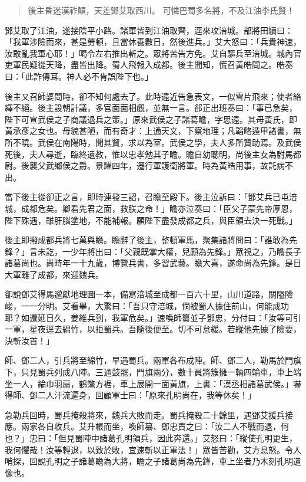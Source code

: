 \begin{quote}
後主昏迷漢祚顛，天差鄧艾取西川。
可憐巴蜀多名將，不及江油李氏賢！
\end{quote}

鄧艾取了江油，遂接陰平小路。諸軍皆到江油取齊，逕來攻涪城。部將田續曰：「我軍涉險而來，甚是勞頓，且當休養數日，然後進兵。」艾大怒曰：「兵貴神速，汝敢亂我軍心耶！」喝令左右推出斬之。眾將苦告方免。艾自驅兵至涪城。城內官吏軍民疑從天降，盡皆出降。蜀人飛報入成都。後主聞知，慌召黃皓問之。皓奏曰：「此詐傳耳。神人必不肯誤陛下也。」

後主又召師婆問時，卻不知何處去了。此時遠近告急表文，一似雪片飛來；使者絡繹不絕。後主設朝計議，多官面面相覷，並無一言。郤正出班奏曰：「事已急矣，陛下可宣武侯之子商議退兵之策。」原來武侯之子諸葛瞻，字思遠。其母黃氏，即黃承彥之女也。母貌甚陋，而有奇才：上通天文，下察地理；凡韜略遁甲諸書，無所不曉。武侯在南陽時，聞其賢，求以為室。武侯之學，夫人多所贊助焉。及武侯死後，夫人尋逝，臨終遺教，惟以忠孝勉其子瞻。瞻自幼聰明，尚後主女為駙馬都尉。後襲父武鄉侯之爵。景耀四年，遷行軍護衛將軍。時為黃皓用事，故託病不出。

當下後主從卻正之言，即時連發三詔，召瞻至殿下。後主泣訴曰：「鄧艾兵已屯涪城，成都危矣。卿看先君之面，救朕之命！」瞻亦泣奏曰：「臣父子蒙先帝厚恩，陛下殊遇，雖肝腦塗地，不能補報。願陛下盡發成都之兵，與臣領去決一死戰。」

後主即撥成都兵將七萬與瞻。瞻辭了後主，整頓軍馬，聚集諸將問曰：「誰敢為先鋒？」言未訖，一少年將出曰：「父親既掌大權，兒願為先鋒。」眾視之，乃瞻長子諸葛尚也。尚時年一十九歲，博覽兵書，多習武藝。瞻大喜，遂命尚為先鋒。是日大軍離了成都，來迎魏兵。

卻說鄧艾得馬邈獻地理圖一本，備寫涪城至成都一百六十里，山川道路，關隘險峻，一一分明。艾看畢，大驚曰：「吾只守涪城，倘被蜀人據住前山，何能成功耶？如遷延日久，姜維兵到，我軍危矣。」速喚師纂並子鄧忠，分付曰：「汝等可引一軍，星夜逕去綿竹，以拒蜀兵。吾隨後便至。切不可怠緩。若縱他先據了險要，決斬汝首！」

師、鄧二人，引兵將至綿竹，早遇蜀兵。兩軍各布成陣。師、鄧二人，勒馬於門旗下，只見蜀兵列成八陣。三通鼓罷，門旗兩分，數十員將簇擁一輛四輪車，車上端坐一人，綸巾羽扇，鶴氅方裾，車上展開一面黃旗，上書：「漢丞相諸葛武侯。」嚇得師、鄧二人汗流遍身，回顧軍士曰：「原來孔明尚在，我等休矣！」

急勒兵回時，蜀兵掩殺將來，魏兵大敗而走。蜀兵掩殺二十餘里，遇鄧艾援兵接應。兩家各自收兵。艾升帳而坐，喚師纂、鄧忠責之曰：「汝二人不戰而退，何也？」忠曰：「但見蜀陣中諸葛孔明領兵，因此奔還。」艾怒曰：「縱使孔明更生，我何懼哉！汝等輕退，以致於敗，宜速斬以正軍法！」眾皆苦勸，艾方息怒。令人哨探，回說孔明之子諸葛瞻為大將，瞻之子諸葛尚為先鋒，車上坐者乃木刻孔明遺像也。

